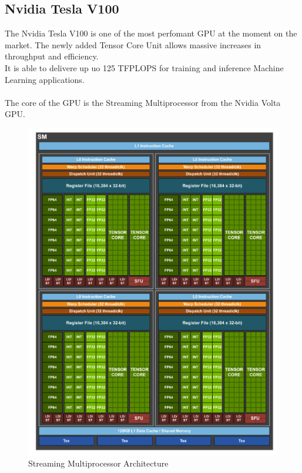 \subsection{Nvidia Tesla V100}
The Nvidia Tesla V100 is one of the most perfomant GPU at the moment on the market. The newly added Tensor Core Unit allows massive increases in  throughput and efficiency.\\It is able to delivere up uo 125 TFPLOPS for training and inference Machine Learning applications. \\\\

The core of the GPU is the Streaming Multiprocessor from the Nvidia Volta GPU.
\begin{figure}[!htbp] 
\centering
\captionsetup{justification=centering}
  \includegraphics[scale=0.9]{./figure/volta_sm_arch.PNG}
\caption{Streaming Multiprocessor Architecture}
  \label{fig:voltasmarch}
\end{figure} 


